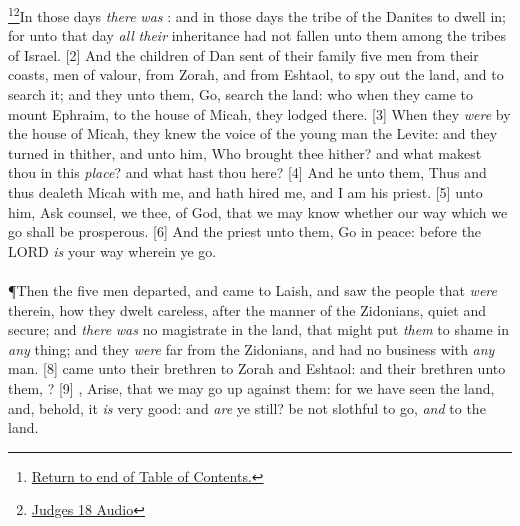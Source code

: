 \footnote{\textcolor[rgb]{0.00,0.25,0.00}{\hyperlink{TOC}{Return to end of Table of Contents.}}}\footnote{\href{https://audiobible.com/bible/judges_18.html}{\textcolor[cmyk]{0.99998,1,0,0}{Judges 18 Audio}}}\textcolor[cmyk]{0.99998,1,0,0}{In those days \emph{there} \emph{was} : and in those days the tribe of the Danites  to dwell in; for unto that day \emph{all} \emph{their} inheritance had not fallen unto them among the tribes of Israel.}
[2] \textcolor[cmyk]{0.99998,1,0,0}{And the children of Dan sent of their family five men from their coasts, men of valour, from Zorah, and from Eshtaol, to spy out the land, and to search it; and they  unto them, Go, search the land: who when they came to mount Ephraim, to the house of Micah, they lodged there.}
[3] \textcolor[cmyk]{0.99998,1,0,0}{When they \emph{were} by the house of Micah, they knew the voice of the young man the Levite: and they turned in thither, and  unto him, Who brought thee hither? and what makest thou in this \emph{place}? and what hast thou here?}
[4] \textcolor[cmyk]{0.99998,1,0,0}{And he  unto them, Thus and thus dealeth Micah with me, and hath hired me, and I am his priest.}
[5] \textcolor[cmyk]{0.99998,1,0,0}{  unto him, Ask counsel, we  thee, of God, that we may know whether our way which we go shall be prosperous.}
[6] \textcolor[cmyk]{0.99998,1,0,0}{And the priest  unto them, Go in peace: before the LORD \emph{is} your way wherein ye go.}\\
\\
\P \textcolor[cmyk]{0.99998,1,0,0}{Then the five men departed, and came to Laish, and saw the people that \emph{were} therein, how they dwelt careless, after the manner of the Zidonians, quiet and secure; and \emph{there} \emph{was} no magistrate in the land, that might put \emph{them} to shame in \emph{any} thing; and they \emph{were} far from the Zidonians, and had no business with \emph{any} man.}
[8] \textcolor[cmyk]{0.99998,1,0,0}{ came unto their brethren to Zorah and Eshtaol: and their brethren  unto them, ?}
[9] \textcolor[cmyk]{0.99998,1,0,0}{ , Arise, that we may go up against them: for we have seen the land, and, behold, it \emph{is} very good: and \emph{are} ye still? be not slothful to go, \emph{and} to  the land.}
